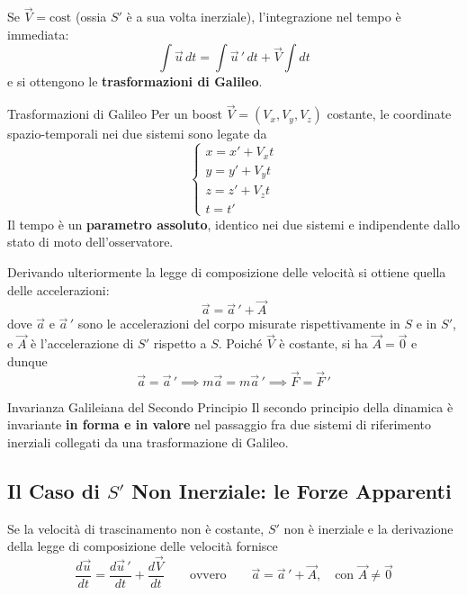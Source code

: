 Se $\vec{V} = \text{cost}$ (ossia $S'$ è a sua volta inerziale), l'integrazione nel tempo è immediata:
\begin{equation*}
    \int \vec{u} \, dt = \int \vec{u}\,' \, dt + \vec{V} \int dt
\end{equation*}
e si ottengono le \textbf{trasformazioni di Galileo}.

\begin{definizione}{Trasformazioni di Galileo}
Per un boost $\vec{V} = (V_x, V_y, V_z)$ costante, le coordinate spazio-temporali nei due sistemi sono legate da
\begin{equation}
    \begin{cases}
        x = x' + V_x t \\
        y = y' + V_y t \\
        z = z' + V_z t \\
        t = t'
    \end{cases}
\end{equation}
Il tempo è un \textbf{parametro assoluto}, identico nei due sistemi e indipendente dallo stato di moto dell'osservatore.
\end{definizione}

Derivando ulteriormente la legge di composizione delle velocità si ottiene quella delle accelerazioni:
\begin{equation}
    \vec{a} = \vec{a}\,' + \vec{A}
\end{equation}
dove $\vec{a}$ e $\vec{a}\,'$ sono le accelerazioni del corpo misurate rispettivamente in $S$ e in $S'$, e $\vec{A}$ è l'accelerazione di $S'$ rispetto a $S$. Poiché $\vec{V}$ è costante, si ha $\vec{A} = \vec{0}$ e dunque
\begin{equation}
    \vec{a} = \vec{a}\,' \implies m\vec{a} = m\vec{a}\,' \implies \vec{F} = \vec{F}\,'
\end{equation}

\begin{teorema}{Invarianza Galileiana del Secondo Principio}
Il secondo principio della dinamica è invariante \textbf{in forma e in valore} nel passaggio fra due sistemi di riferimento inerziali collegati da una trasformazione di Galileo.
\end{teorema}

\subsection{Il Caso di $S'$ Non Inerziale: le Forze Apparenti}

Se la velocità di trascinamento non è costante, $S'$ non è inerziale e la derivazione della legge di composizione delle velocità fornisce
\begin{equation}
    \frac{d\vec{u}}{dt} = \frac{d\vec{u}\,'}{dt} + \frac{d\vec{V}}{dt}
    \qquad \text{ovvero} \qquad
    \vec{a} = \vec{a}\,' + \vec{A}, \quad \text{con } \vec{A} \neq \vec{0}
\end{equation}

